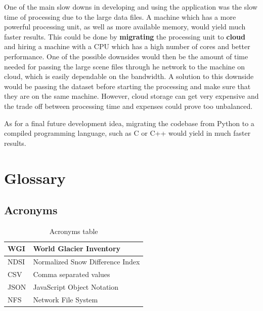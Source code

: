 \documentclass[12pt, a4paper]{report}
\begin{document}
	\par One of the main slow downs in developing and using the application was the slow time of processing due to the large data files. A machine which has a more powerful processing unit, as well as more available memory, would yield much faster results. This could be done by \textbf{migrating} the processing unit to \textbf{cloud} and hiring a machine with a CPU which has a high number of cores and better performance. One of the possible downsides would then be the amount of time needed for passing the large scene files through he network to the machine on cloud, which is easily dependable on the bandwidth. A solution to this downside would be passing the dataset before starting the processing and make sure that they are on the same machine. However, cloud storage can get very expensive and the trade off between processing time and expenses could prove too unbalanced.
	
	\par As for a final future development idea, migrating the codebase from Python to a compiled programming language, such as C or C++ would yield in much faster results.
	
	\newpage{}	
	
	
	
	\newpage{}
	\chapter{Glossary}
	
	
	\section{Acronyms}
	
		\begin{table} [H]
		\centering
		\begin{tabular} {|  l | L{10cm} |}
			\hline
			WGI & World Glacier Inventory \\ [0.2ex]
			\hline
			NDSI & Normalized Snow Difference Index \\ [0.2ex]
			\hline
			CSV & Comma separated values \\ [0.2ex]
			\hline
			JSON & JavaScript Object Notation \\ [0.2ex]
			\hline
			NFS & Network File System \\ [0.2ex]
			\hline
		\end{tabular}
		\caption{Acronyms table }
		\label{table:acron}
	\end{table}
	
\end{document}
